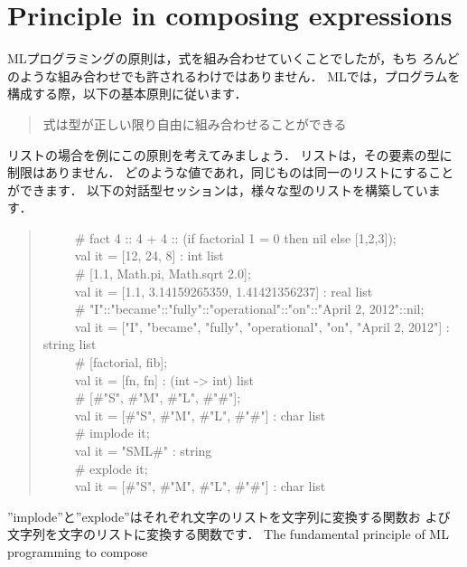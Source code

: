 \documentclass{jbook}
\newcommand{\txt}[2]{#2}
\newcommand{\myem}{\ \ \ \ \  }
\begin{document}
\section{\txt{式の組み合わせの原則}{Principle in composing expressions}}
\label{sec:tutorialTypingprinciple}

\ifx\jp%
	MLプログラミングの原則は，式を組み合わせていくことでしたが，もち
ろんどのような組み合わせでも許されるわけではありません．
	MLでは，プログラムを構成する際，以下の基本原則に従います．
\begin{quote}
式は型が正しい限り自由に組み合わせることができる
\end{quote}
	リストの場合を例にこの原則を考えてみましょう．
	リストは，その要素の型に制限はありません．
	どのような値であれ，同じものは同一のリストにすることができます．
	以下の対話型セッションは，様々な型のリストを構築しています．
\begin{tt}
\begin{quote}
\myem \# fact 4 :: 4 + 4 :: (if factorial 1 = 0 then nil else [1,2,3]);
\\\myem  val it = [12, 24, 8] : int list
\\\myem   \# [1.1, Math.pi, Math.sqrt 2.0];
\\\myem   val it = [1.1, 3.14159265359, 1.41421356237] : real list
\\\myem   \# "I"::"became"::"fully"::"operational"::"on"::"April 2, 2012"::nil;
\\\myem   val it = ["I", "became", "fully", "operational", "on", "April 2, 2012"] : string list
\\\myem   \# [factorial, fib];
\\\myem   val it = [fn, fn] : (int  -> int) list
\\\myem   \# [\#"S", \#"M", \#"L", \#"\#"];
\\\myem   val it = [\#"S", \#"M", \#"L", \#"\#"] : char list
\\\myem   \# implode it;
\\\myem   val it = "SML\#" : string
\\\myem   \# explode it;
\\\myem   val it = [\#"S", \#"M", \#"L", \#"\#"] : char list
\end{quote}
\end{tt}
''implode''と''explode''はそれぞれ文字のリストを文字列に変換する関数お
よび文字列を文字のリストに変換する関数です．
\else%
	The fundamental principle of ML programming to compose
\end{document}

